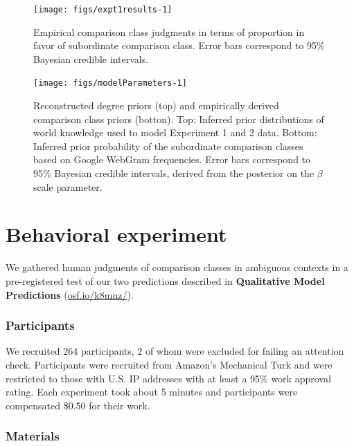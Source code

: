 \documentclass[doc]{apa6}
\begin{document}
\begin{figure}[htb]

{\centering \texttt{[image: figs/expt1results-1]} 

}

\caption{Empirical comparison class judgments in terms of proportion in favor of subordinate comparison class.  Error bars correspond to 95\% Bayesian credible intervals.}\label{fig:expt1results}
\end{figure}

\begin{figure}[htb]

{\centering \texttt{[image: figs/modelParameters-1]} 

}

\caption{Reconstructed degree priors (top) and empirically derived comparison class priors (botton). Top: Inferred prior distributions of world knowledge used to model Experiment 1 and 2 data. Bottom: Inferred prior probability of the subordinate comparison classes based on Google WebGram frequencies. Error bars correspond to 95\% Bayesian credible intervals, derived from the posterior on the $\beta$ scale parameter.}\label{fig:modelParameters}
\end{figure}

\section{Behavioral experiment}

We gathered human judgments of comparison classes in ambiguous contexts
in a pre-registered test of our two predictions described in
\textbf{Qualitative Model Predictions} (\url{osf.io/k8mnz/}).

\subsubsection{Participants}

We recruited 264 participants, 2 of whom were excluded for failing an
attention check. Participants were recruited from Amazon's Mechanical
Turk and were restricted to those with U.S. IP addresses with at least a
95\% work approval rating. Each experiment took about 5 minutes and
participants were compensated \$0.50 for their work.

\subsubsection{Materials}
\end{document}
